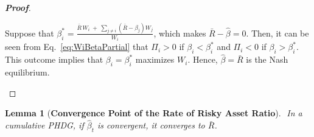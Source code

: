 \documentclass[11pt,a4paper]{article}
\newtheorem{lemma}{Lemma}
\begin{document}
\begin{proof}[\textbf{Proof}]
\begin{itemize}
		Suppose that $\beta_{i}^\ast = \frac{\bar{R}\, W_{i}\ +\ \sum_{j\neq i}(\bar{R} - \beta_{j})W_{j}}{W_i}$, which makes $\bar{R} - \hat{\beta} = 0$. Then, it can be seen from Eq.~\eqref{eq:WiBetaPartial} that $\Pi_i>0$ if $\beta_{i}<\beta_{i}^\ast$ and $\Pi_{i}<0$ if $\beta_{i}>\beta_{i}^\ast$. This outcome implies that $\beta_{i} = \beta_{i}^\ast$ maximizes $W_i$. Hence, $\hat{\beta}=\bar{R}$ is the Nash equilibrium.
	\end{itemize}
\end{proof}


\bigskip 

	\begin{lemma}[\textbf{Convergence Point of the Rate of Risky Asset Ratio}] 
		\label{prop:hat-beta-convergence-to-bar-R} 
	    $ $ \newline
		In a cumulative PHDG, if $\hat\beta_t$ is convergent, it converges to $\bar R$. 
	\end{lemma}
\end{document}
